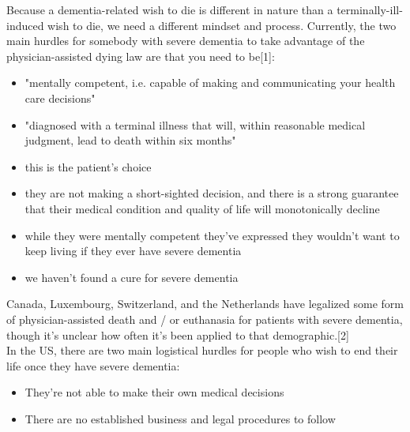 \documentclass{proposalnsf}
\begin{document}
Because a dementia-related wish to die is different in nature than a terminally-ill-induced wish to die, we need a different mindset and process.
Currently, the two main hurdles for somebody with severe dementia to take advantage of the physician-assisted dying law are that you need to be[1]:
\begin{itemize}
    \item{"mentally competent, i.e. capable of making and communicating your health care decisions"}
    \item{"diagnosed with a terminal illness that will, within reasonable medical judgment, lead to death within six months"}
\end{itemize}

\begin{itemize}
    \item{this is the patient's choice}
    \item{they are not making a short-sighted decision, and there is a strong guarantee that their medical condition and quality of life will monotonically decline}
\end{itemize}

\begin{itemize}
    \item{while they were mentally competent they've expressed they wouldn't want to keep living if they ever have severe dementia}
    \item{we haven't found a cure for severe dementia}
\end{itemize}


\bigskip
\bigskip

Canada, Luxembourg, Switzerland, and the Netherlands have legalized some form of physician-assisted death and / or euthanasia for patients with severe dementia, though it's unclear how often it's been applied to that demographic.[2]
\\

In the US, there are two main logistical hurdles for people who wish to end their life once they have severe dementia:
\begin{itemize}
    \item{They're not able to make their own medical decisions}
    \item{There are no established business and legal procedures to follow}
\end{itemize}
    
\end{document}

